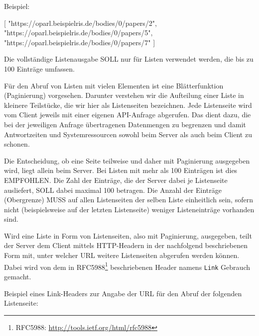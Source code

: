 \documentclass[,a4paper]{article}
\newenvironment{Shaded}{}{}
\newcommand{\StringTok}[1]{\textcolor[rgb]{0.25,0.44,0.63}{{#1}}}
\newcommand{\OtherTok}[1]{\textcolor[rgb]{0.00,0.44,0.13}{{#1}}}
\begin{document}
Beispiel:

\begin{Shaded}
\begin{Highlighting}[]
\OtherTok{[}
    \StringTok{"https://oparl.beispielris.de/bodies/0/papers/2"}\OtherTok{,}
    \StringTok{"https://oparl.beispielris.de/bodies/0/papers/5"}\OtherTok{,}
    \StringTok{"https://oparl.beispielris.de/bodies/0/papers/7"}
\OtherTok{]}
\end{Highlighting}
\end{Shaded}

Die vollständige Listenausgabe SOLL nur für Listen verwendet werden, die
bis zu 100 Einträge umfassen.


Für den Abruf von Listen mit vielen Elementen ist eine Blätterfunktion
(Paginierung) vorgesehen. Darunter verstehen wir die Aufteilung einer
Liste in kleinere Teilstücke, die wir hier als Listenseiten bezeichnen.
Jede Listenseite wird vom Client jeweils mit einer eigenen API-Anfrage
abgerufen. Das dient dazu, die bei der jeweiligen Anfrage übertragenen
Datenmengen zu begrenzen und damit Antwortzeiten und Systemressourcen
sowohl beim Server als auch beim Client zu schonen.

Die Entscheidung, ob eine Seite teilweise und daher mit Paginierung
ausgegeben wird, liegt allein beim Server. Bei Listen mit mehr als 100
Einträgen ist dies EMPFOHLEN. Die Zahl der Einträge, die der Server
dabei je Listenseite ausliefert, SOLL dabei maximal 100 betragen. Die
Anzahl der Einträge (Obergrenze) MUSS auf allen Listenseiten der selben
Liste einheitlich sein, sofern nicht (beispielsweise auf der letzten
Listenseite) weniger Listeneinträge vorhanden sind.

Wird eine Liste in Form von Listenseiten, also mit Paginierung,
ausgegeben, teilt der Server dem Client mittels HTTP-Headern in der
nachfolgend beschriebenen Form mit, unter welcher URL weitere
Listenseiten abgerufen werden können. Dabei wird von dem in
RFC5988\footnote{RFC5988: \url{http://tools.ietf.org/html/rfc5988}}
beschriebenen Header namens \texttt{Link} Gebrauch gemacht.

Beispiel eines Link-Headers zur Angabe der URL für den Abruf der
folgenden Listenseite:
\end{document}
